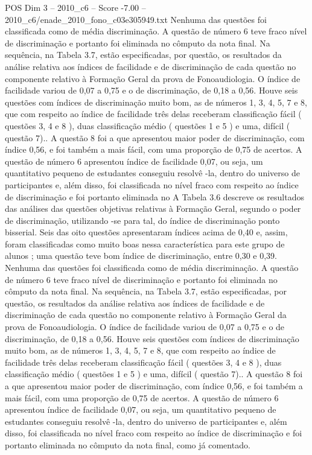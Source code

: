 \begin{textsample}{POS Dim 3 – 2010\_c6 – Score -7.00 – 2010\_c6/enade\_2010\_fono\_c03e305949.txt}
Nenhuma das questões foi classificada como de média discriminação.
A questão de número 6 teve fraco nível de discriminação e portanto foi eliminada no cômputo da nota final.
Na sequência, na Tabela 3.7, estão especificadas, por questão, os resultados da análise relativa aos índices de facilidade e de discriminação de cada questão no componente relativo à Formação Geral da prova de Fonoaudiologia.
O índice de facilidade variou de 0,07 a 0,75 e o de discriminação, de 0,18 a 0,56.
Houve seis questões com índices de discriminação muito bom, as de números 1, 3, 4, 5, 7 e 8, que com respeito ao índice de facilidade três delas receberam classificação fácil ( questões 3, 4 e 8 ), duas classificação médio ( questões 1 e 5 ) e uma, difícil ( questão 7)..
A questão 8 foi a que apresentou maior poder de discriminação, com índice 0,56, e foi também a mais fácil, com uma proporção de 0,75 de acertos.
A questão de número 6 apresentou índice de facilidade 0,07, ou seja, um quantitativo pequeno de estudantes conseguiu resolvê -la, dentro do universo de participantes e, além disso, foi classificada no nível fraco com respeito ao índice de discriminação e foi portanto eliminada no A Tabela 3.6 descreve os resultados das análises das questões objetivas relativas à Formação Geral, segundo o poder de discriminação, utilizando -se para tal, do índice de discriminação ponto bisserial.
Seis das oito questões apresentaram índices acima de 0,40 e, assim, foram classificadas como muito boas nessa característica para este grupo de alunos ; uma questão teve bom índice de discriminação, entre 0,30 e 0,39.
Nenhuma das questões foi classificada como de média discriminação.
A questão de número 6 teve fraco nível de discriminação e portanto foi eliminada no cômputo da nota final.
Na sequência, na Tabela 3.7, estão especificadas, por questão, os resultados da análise relativa aos índices de facilidade e de discriminação de cada questão no componente relativo à Formação Geral da prova de Fonoaudiologia.
O índice de facilidade variou de 0,07 a 0,75 e o de discriminação, de 0,18 a 0,56.
Houve seis questões com índices de discriminação muito bom, as de números 1, 3, 4, 5, 7 e 8, que com respeito ao índice de facilidade três delas receberam classificação fácil ( questões 3, 4 e 8 ), duas classificação médio ( questões 1 e 5 ) e uma, difícil ( questão 7)..
A questão 8 foi a que apresentou maior poder de discriminação, com índice 0,56, e foi também a mais fácil, com uma proporção de 0,75 de acertos.
A questão de número 6 apresentou índice de facilidade 0,07, ou seja, um quantitativo pequeno de estudantes conseguiu resolvê -la, dentro do universo de participantes e, além disso, foi classificada no nível fraco com respeito ao índice de discriminação e foi portanto eliminada no cômputo da nota final, como já comentado.

\end{textsample}
